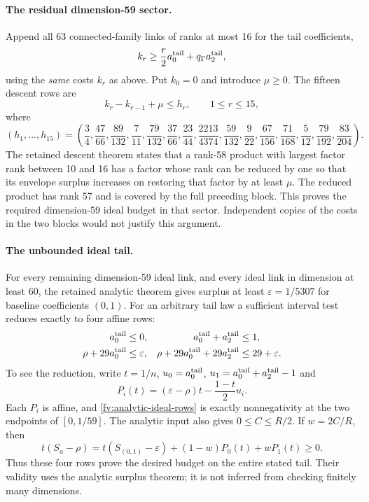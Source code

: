 \paragraph{The residual dimension-59 sector.}
Append all 63 connected-family links of ranks at most 16 for the
tail coefficients,
\begin{equation}\label{fv:tail-factor-links}
             k_r\ge\frac r2a^{\rm tail}_0
                                      +q_\Gamma a^{\rm tail}_2,
\end{equation}
using the \emph{same} costs $k_r$ as above. Put $k_0=0$ and introduce
$\mu\ge0$. The fifteen descent rows are
\begin{equation}\label{fv:descent}
 k_r-k_{r-1}+\mu\le h_r,\qquad 1\le r\le15,
\end{equation}
where
\[
 (h_1,\ldots,h_{15})=
 \left(\frac34,\frac{47}{66},\frac{89}{132},\frac7{11},
 \frac{79}{132},\frac{37}{66},\frac{23}{44},
 \frac{2213}{4374},\frac{59}{132},\frac9{22},
 \frac{67}{156},\frac{71}{168},\frac5{12},
 \frac{79}{192},\frac{83}{204}\right).
\]
The retained descent theorem states that a rank-58 product with
largest factor rank between 10 and 16 has a factor whose rank can be
reduced by one so that its envelope surplus increases on restoring
that factor by at least $\mu$. The reduced product has rank 57 and
is covered by the full preceding block. This proves the required
dimension-59 ideal budget in that sector. Independent copies of the
costs in the two blocks would not justify this argument.

\paragraph{The unbounded ideal tail.}
For every remaining dimension-59 ideal link, and every ideal link
in dimension at least 60, the retained analytic theorem gives surplus
at least $\varepsilon=1/5307$ for baseline coefficients $(0,1)$.
For an arbitrary tail law a sufficient interval test reduces exactly
to four affine rows:
\begin{align}
 a^{\rm tail}_0&\le0,&
 a^{\rm tail}_0+a^{\rm tail}_2&\le1,\notag\\
 \rho+29a^{\rm tail}_0&\le\varepsilon,&
 \rho+29a^{\rm tail}_0+29a^{\rm tail}_2&\le29+\varepsilon.
 \label{fv:analytic-ideal-rows}
\end{align}
To see the reduction, write $t=1/n$,
$u_0=a^{\rm tail}_0$, $u_1=a^{\rm tail}_0+a^{\rm tail}_2-1$ and
\[
 P_i(t)=(\varepsilon-\rho)t-\frac{1-t}{2}u_i.
\]
Each $P_i$ is affine, and \eqref{fv:analytic-ideal-rows} is exactly
nonnegativity at the two endpoints of $[0,1/59]$. The analytic input
also gives $0\le C\le R/2$. If $w=2C/R$, then
\[
 t(S_a-\rho)=t(S_{(0,1)}-\varepsilon)
                         +(1-w)P_0(t)+wP_1(t)\ge0.
\]
Thus these four rows prove the desired budget on the entire stated
tail. Their validity uses the analytic surplus theorem; it is not
inferred from checking finitely many dimensions.

